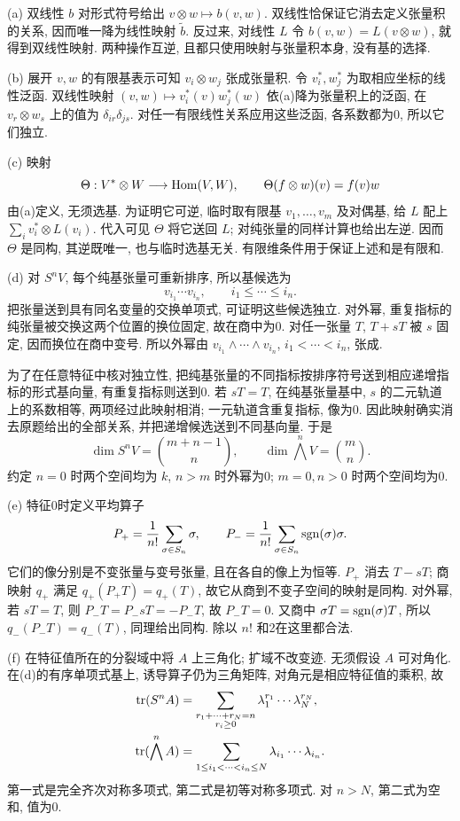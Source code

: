 \begin{solution}
(a) 双线性 $b$ 对形式符号给出 $v\otimes w\mapsto b(v,w)$. 双线性恰保证它消去定义张量积的关系, 因而唯一降为线性映射 $\widetilde b$. 反过来, 对线性 $L$ 令 $b(v,w)=L(v\otimes w)$, 就得到双线性映射. 两种操作互逆, 且都只使用映射与张量积本身, 没有基的选择.

(b) 展开 $v,w$ 的有限基表示可知 $v_i\otimes w_j$ 张成张量积. 令 $v_i^*,w_j^*$ 为取相应坐标的线性泛函. 双线性映射 $(v,w)\mapsto v_i^*(v)w_j^*(w)$ 依(a)降为张量积上的泛函, 在 $v_r\otimes w_s$ 上的值为 $\delta_{ir}\delta_{js}$. 对任一有限线性关系应用这些泛函, 各系数都为0, 所以它们独立.

(c) 映射
\[
\Theta:V^*\otimes W\longrightarrow\operatorname{Hom}(V,W),\qquad
\Theta(f\otimes w)(v)=f(v)w
\]
由(a)定义, 无须选基. 为证明它可逆, 临时取有限基 $v_1,\ldots,v_m$ 及对偶基, 给 $L$ 配上 $\sum_i v_i^*\otimes L(v_i)$. 代入可见 $\Theta$ 将它送回 $L$; 对纯张量的同样计算也给出左逆. 因而 $\Theta$ 是同构, 其逆既唯一, 也与临时选基无关. 有限维条件用于保证上述和是有限和.

(d) 对 $S^nV$, 每个纯基张量可重新排序, 所以基候选为
\[
v_{i_1}\cdots v_{i_n},\qquad i_1\le\cdots\le i_n.
\]
把张量送到具有同名变量的交换单项式, 可证明这些候选独立. 对外幂, 重复指标的纯张量被交换这两个位置的换位固定, 故在商中为0. 对任一张量 $T$, $T+sT$ 被 $s$ 固定, 因而换位在商中变号. 所以外幂由 $v_{i_1}\wedge\cdots\wedge v_{i_n}$, $i_1<\cdots<i_n$, 张成.

为了在任意特征中核对独立性, 把纯基张量的不同指标按排序符号送到相应递增指标的形式基向量, 有重复指标则送到0. 若 $sT=T$, 在纯基张量基中, $s$ 的二元轨道上的系数相等, 两项经过此映射相消; 一元轨道含重复指标, 像为0. 因此映射确实消去原题给出的全部关系, 并把递增候选送到不同基向量. 于是
\[
\dim S^nV=\binom{m+n-1}{n},\qquad
\dim\bigwedge^nV=\binom mn.
\]
约定 $n=0$ 时两个空间均为 $k$, $n>m$ 时外幂为0; $m=0,n>0$ 时两个空间均为0.

(e) 特征0时定义平均算子
\[
P_+=\frac1{n!}\sum_{\sigma\in S_n}\sigma,
\qquad P_-=\frac1{n!}\sum_{\sigma\in S_n}\operatorname{sgn}(\sigma)\sigma.
\]
它们的像分别是不变张量与变号张量, 且在各自的像上为恒等. $P_+$ 消去 $T-sT$; 商映射 $q_+$ 满足 $q_+(P_+T)=q_+(T)$, 故它从商到不变子空间的映射是同构. 对外幂, 若 $sT=T$, 则 $P_-T=P_-sT=-P_-T$, 故 $P_-T=0$. 又商中 $\sigma T=\operatorname{sgn}(\sigma)T$, 所以 $q_-(P_-T)=q_-(T)$, 同理给出同构. 除以 $n!$ 和2在这里都合法.

(f) 在特征值所在的分裂域中将 $A$ 上三角化; 扩域不改变迹. 无须假设 $A$ 可对角化. 在(d)的有序单项式基上, 诱导算子仍为三角矩阵, 对角元是相应特征值的乘积, 故
\begin{align*}
\operatorname{tr}(S^nA)&=\sum_{\substack{r_1+\cdots+r_N=n\\ r_i\ge0}}
\lambda_1^{r_1}\cdots\lambda_N^{r_N},\\
\operatorname{tr}(\bigwedge^nA)&=\sum_{1\le i_1<\cdots<i_n\le N}
\lambda_{i_1}\cdots\lambda_{i_n}.
\end{align*}
第一式是完全齐次对称多项式, 第二式是初等对称多项式. 对 $n>N$, 第二式为空和, 值为0.


\end{solution}
